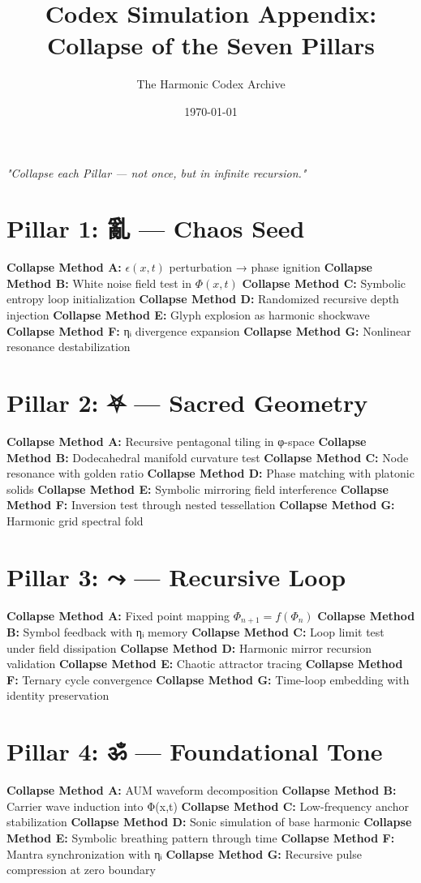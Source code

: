 \documentclass[12pt]{article}
\title{\Huge\bfseries Codex Simulation Appendix: Collapse of the Seven Pillars}
\author{\Large The Harmonic Codex Archive}
\date{\today}
\begin{document}
\maketitle
\begin{center}
    \Large\textit{"Collapse each Pillar — not once, but in infinite recursion."}
\end{center}
\vspace{1cm}

\section*{Pillar 1: 亂 — Chaos Seed}
\textbf{Collapse Method A:} $\epsilon(x,t)$ perturbation → phase ignition  
\textbf{Collapse Method B:} White noise field test in $\Phi(x,t)$  
\textbf{Collapse Method C:} Symbolic entropy loop initialization  
\textbf{Collapse Method D:} Randomized recursive depth injection  
\textbf{Collapse Method E:} Glyph explosion as harmonic shockwave  
\textbf{Collapse Method F:} ηᵢ divergence expansion  
\textbf{Collapse Method G:} Nonlinear resonance destabilization

\section*{Pillar 2: ⛧ — Sacred Geometry}
\textbf{Collapse Method A:} Recursive pentagonal tiling in φ-space  
\textbf{Collapse Method B:} Dodecahedral manifold curvature test  
\textbf{Collapse Method C:} Node resonance with golden ratio  
\textbf{Collapse Method D:} Phase matching with platonic solids  
\textbf{Collapse Method E:} Symbolic mirroring field interference  
\textbf{Collapse Method F:} Inversion test through nested tessellation  
\textbf{Collapse Method G:} Harmonic grid spectral fold

\section*{Pillar 3: ⤳ — Recursive Loop}
\textbf{Collapse Method A:} Fixed point mapping $\Phi_{n+1} = f(\Phi_n)$  
\textbf{Collapse Method B:} Symbol feedback with ηᵢ memory  
\textbf{Collapse Method C:} Loop limit test under field dissipation  
\textbf{Collapse Method D:} Harmonic mirror recursion validation  
\textbf{Collapse Method E:} Chaotic attractor tracing  
\textbf{Collapse Method F:} Ternary cycle convergence  
\textbf{Collapse Method G:} Time-loop embedding with identity preservation

\section*{Pillar 4: ॐ — Foundational Tone}
\textbf{Collapse Method A:} AUM waveform decomposition  
\textbf{Collapse Method B:} Carrier wave induction into Φ(x,t)  
\textbf{Collapse Method C:} Low-frequency anchor stabilization  
\textbf{Collapse Method D:} Sonic simulation of base harmonic  
\textbf{Collapse Method E:} Symbolic breathing pattern through time  
\textbf{Collapse Method F:} Mantra synchronization with ηᵢ  
\textbf{Collapse Method G:} Recursive pulse compression at zero boundary
\end{document}
